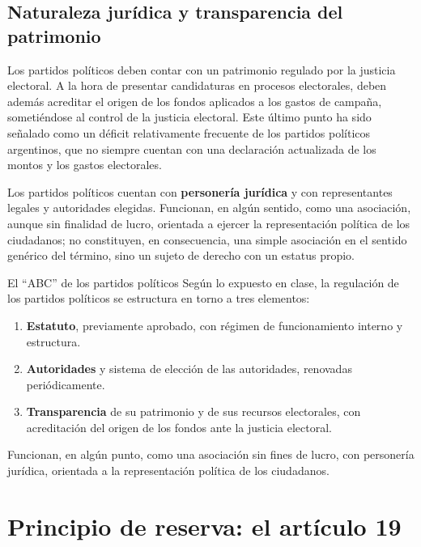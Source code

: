 \documentclass[12pt,oneside]{book}
\begin{document}
\section{Naturaleza jurídica y transparencia del patrimonio}

Los partidos políticos deben contar con un patrimonio regulado por la justicia electoral. A la hora de presentar candidaturas en procesos electorales, deben además acreditar el origen de los fondos aplicados a los gastos de campaña, sometiéndose al control de la justicia electoral. Este último punto ha sido señalado como un déficit relativamente frecuente de los partidos políticos argentinos, que no siempre cuentan con una declaración actualizada de los montos y los gastos electorales.

Los partidos políticos cuentan con \textbf{personería jurídica} y con representantes legales y autoridades elegidas. Funcionan, en algún sentido, como una asociación, aunque sin finalidad de lucro, orientada a ejercer la representación política de los ciudadanos; no constituyen, en consecuencia, una simple asociación en el sentido genérico del término, sino un sujeto de derecho con un estatus propio.

\begin{definition}{El ``ABC'' de los partidos políticos}
Según lo expuesto en clase, la regulación de los partidos políticos se estructura en torno a tres elementos:
\begin{enumerate}
\item \textbf{Estatuto}, previamente aprobado, con régimen de funcionamiento interno y estructura.
\item \textbf{Autoridades} y sistema de elección de las autoridades, renovadas periódicamente.
\item \textbf{Transparencia} de su patrimonio y de sus recursos electorales, con acreditación del origen de los fondos ante la justicia electoral.
\end{enumerate}
Funcionan, en algún punto, como una asociación sin fines de lucro, con personería jurídica, orientada a la representación política de los ciudadanos.
\end{definition}

\chapter[Principio de reserva]{Principio de reserva: el artículo 19}
\end{document}
